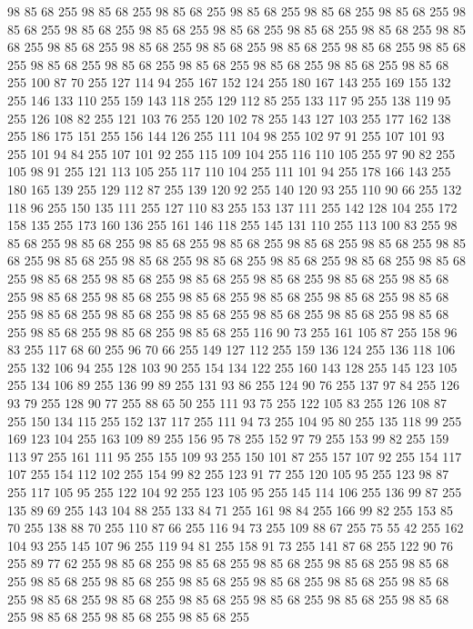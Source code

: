 98 85 68 255 98 85 68 255 98 85 68 255 98 85 68 255 98 85 68 255 98 85 68 255 98 85 68 255 98 85 68 255 98 85 68 255 98 85 68 255 98 85 68 255 98 85 68 255 98 85 68 255 98 85 68 255 98 85 68 255 98 85 68 255 98 85 68 255 98 85 68 255 98 85 68 255 98 85 68 255 98 85 68 255 98 85 68 255 98 85 68 255 98 85 68 255 98 85 68 255 100 87 70 255 127 114 94 255 167 152 124 255 180 167 143 255 169 155 132 255 146 133 110 255 159 143 118 255 129 112 85 255 133 117 95 255 138 119 95 255 126 108 82 255 121 103 76 255 120 102 78 255 143 127 103 255 177 162 138 255 186 175 151 255 156 144 126 255 111 104 98 255 102 97 91 255 107 101 93 255 101 94 84 255 107 101 92 255 115 109 104 255 116 110 105 255 97 90 82 255 105 98 91 255 121 113 105 255 117 110 104 255 111 101 94 255 178 166 143 255 180 165 139 255 129 112 87 255 139 120 92 255 140 120 93 255 110 90 66 255 132 118 96 255 150 135 111 255 127 110 83 255 153 137 111 255
142 128 104 255 172 158 135 255 173 160 136 255 161 146 118 255 145 131 110 255 113 100 83 255 98 85 68 255 98 85 68 255 98 85 68 255 98 85 68 255 98 85 68 255 98 85 68 255 98 85 68 255 98 85 68 255 98 85 68 255 98 85 68 255 98 85 68 255 98 85 68 255 98 85 68 255 98 85 68 255 98 85 68 255 98 85 68 255 98 85 68 255 98 85 68 255 98 85 68 255 98 85 68 255 98 85 68 255 98 85 68 255 98 85 68 255 98 85 68 255 98 85 68 255 98 85 68 255 98 85 68 255 98 85 68 255 98 85 68 255 98 85 68 255 98 85 68 255 98 85 68 255 98 85 68 255 98 85 68 255 116 90 73 255 161 105 87 255 158 96 83 255 117 68 60 255 96 70 66 255 149 127 112 255 159 136 124 255 136 118 106 255 132 106 94 255 128 103 90 255 154 134 122 255 160 143 128 255 145 123 105 255 134 106 89 255 136 99 89 255 131 93 86 255 124 90 76 255 137 97 84 255 126 93 79 255 128 90 77 255 88 65 50 255 111 93 75 255 122 105 83 255 126 108 87 255
150 134 115 255 152 137 117 255 111 94 73 255 104 95 80 255 135 118 99 255 169 123 104 255 163 109 89 255 156 95 78 255 152 97 79 255 153 99 82 255 159 113 97 255 161 111 95 255 155 109 93 255 150 101 87 255 157 107 92 255 154 117 107 255 154 112 102 255 154 99 82 255 123 91 77 255 120 105 95 255 123 98 87 255 117 105 95 255 122 104 92 255 123 105 95 255 145 114 106 255 136 99 87 255 135 89 69 255 143 104 88 255 133 84 71 255 161 98 84 255 166 99 82 255 153 85 70 255 138 88 70 255 110 87 66 255 116 94 73 255 109 88 67 255 75 55 42 255 162 104 93 255 145 107 96 255 119 94 81 255 158 91 73 255 141 87 68 255 122 90 76 255 89 77 62 255 98 85 68 255 98 85 68 255 98 85 68 255 98 85 68 255 98 85 68 255 98 85 68 255 98 85 68 255 98 85 68 255 98 85 68 255 98 85 68 255 98 85 68 255 98 85 68 255 98 85 68 255 98 85 68 255 98 85 68 255 98 85 68 255 98 85 68 255 98 85 68 255 98 85 68 255 98 85 68 255
